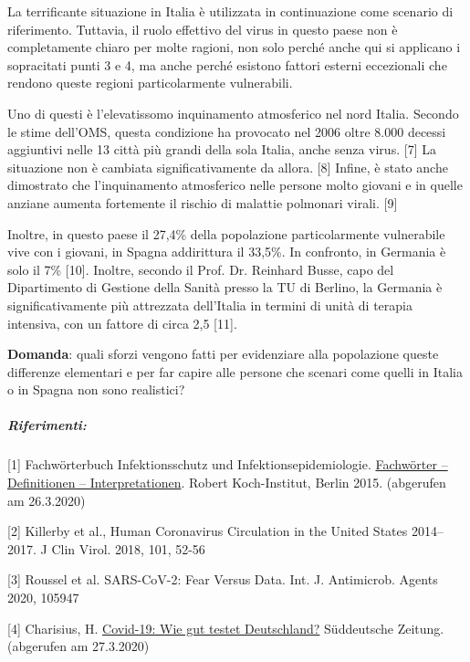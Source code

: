 La terrificante situazione in Italia è utilizzata in continuazione come
scenario di riferimento. Tuttavia, il ruolo effettivo del virus in
questo paese non è completamente chiaro per molte ragioni, non solo
perché anche qui si applicano i sopracitati punti 3 e 4, ma anche perché
esistono fattori esterni eccezionali che rendono queste regioni
particolarmente vulnerabili.

Uno di questi è l'elevatissomo inquinamento atmosferico nel nord Italia.
Secondo le stime dell'OMS, questa condizione ha provocato nel 2006 oltre
8.000 decessi aggiuntivi nelle 13 città più grandi della sola Italia,
anche senza virus. {[}7{]} La situazione non è cambiata
significativamente da allora. {[}8{]} Infine, è stato anche dimostrato
che l'inquinamento atmosferico nelle persone molto giovani e in quelle
anziane aumenta fortemente il rischio di malattie polmonari virali.
{[}9{]}

Inoltre, in questo paese il 27,4\% della popolazione particolarmente
vulnerabile vive con i giovani, in Spagna addirittura il 33,5\%. In
confronto, in Germania è solo il 7\% {[}10{]}. Inoltre, secondo il Prof.
Dr. Reinhard Busse, capo del Dipartimento di Gestione della Sanità
presso la TU di Berlino, la Germania è significativamente più attrezzata
dell'Italia in termini di unità di terapia intensiva, con un fattore di
circa 2,5 {[}11{]}.

\textbf{Domanda}: quali sforzi vengono fatti per evidenziare alla
popolazione queste differenze elementari e per far capire alle persone
che scenari come quelli in Italia o in Spagna non sono realistici?

\hypertarget{riferimenti}{%
\subparagraph{\texorpdfstring{\textbf{Riferimenti:}}{Riferimenti:}}\label{riferimenti}}

{[}1{]} Fachwörterbuch Infektionsschutz und Infektionsepidemiologie.
\href{https://www.rki.de/DE/Content/Service/Publikationen/Fachwoerterbuch_Infektionsschutz.html}{Fachwörter
-- Definitionen -- Interpretationen}. Robert Koch-Institut, Berlin 2015.
(abgerufen am 26.3.2020)

{[}2{]} Killerby et al., Human Coronavirus Circulation in the United
States 2014--2017. J Clin Virol. 2018, 101, 52-56

{[}3{]} Roussel et al. SARS-CoV-2: Fear Versus Data. Int. J. Antimicrob.
Agents 2020, 105947

{[}4{]} Charisius, H.
\href{https://www.sueddeutsche.de/gesundheit/covid-19-coronavirus-testverfahren-1.4855487}{Covid-19:
Wie gut testet Deutschland?} Süddeutsche Zeitung. (abgerufen am
27.3.2020)

